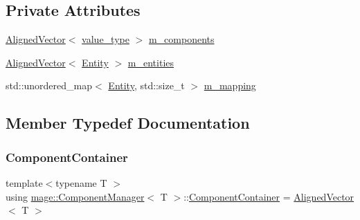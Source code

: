 \subsection*{Private Attributes}
\begin{DoxyCompactItemize}
\item 
\mbox{\hyperlink{namespacemage_a8664bfb5ce2179fc64eae9f82c8a5ba8}{Aligned\+Vector}}$<$ \mbox{\hyperlink{classmage_1_1_component_manager_a56aac3b52842bd8955253fa9b528a58d}{value\+\_\+type}} $>$ \mbox{\hyperlink{classmage_1_1_component_manager_a8bc66b115bd3df295a715d19c9078a3d}{m\+\_\+components}}
\item 
\mbox{\hyperlink{namespacemage_a8664bfb5ce2179fc64eae9f82c8a5ba8}{Aligned\+Vector}}$<$ \mbox{\hyperlink{classmage_1_1_entity}{Entity}} $>$ \mbox{\hyperlink{classmage_1_1_component_manager_a84397106c4d2f50467e978343e1c67db}{m\+\_\+entities}}
\item 
std\+::unordered\+\_\+map$<$ \mbox{\hyperlink{classmage_1_1_entity}{Entity}}, std\+::size\+\_\+t $>$ \mbox{\hyperlink{classmage_1_1_component_manager_a437e11dc75c6992218687007a7d4ab4a}{m\+\_\+mapping}}
\end{DoxyCompactItemize}


\subsection{Member Typedef Documentation}
\mbox{\label{classmage_1_1_component_manager_ae68422d8d8168c7450d116146604efa6}} 
\subsubsection{\texorpdfstring{Component\+Container}{ComponentContainer}}
{\footnotesize\ttfamily template$<$typename T $>$ \\
using \mbox{\hyperlink{classmage_1_1_component_manager}{mage\+::\+Component\+Manager}}$<$ T $>$\+::\mbox{\hyperlink{classmage_1_1_component_manager_ae68422d8d8168c7450d116146604efa6}{Component\+Container}} =  \mbox{\hyperlink{namespacemage_a8664bfb5ce2179fc64eae9f82c8a5ba8}{Aligned\+Vector}}$<$ T $>$}

\mbox{\label{classmage_1_1_component_manager_acc0d5ab8de4583ae2dd99c7bc0784c95}} 
